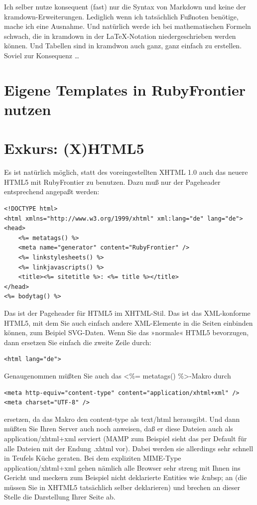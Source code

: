 \documentclass[11pt]{report}
\begin{document}
Ich selber nutze konsequent (fast) nur die Syntax von Markdown und
keine der kramdown-Erweiterungen. Lediglich wenn ich tatsächlich
Fußnoten benötige, mache ich eine Ausnahme. Und natürlich werde ich
bei mathematischen Formeln schwach, die in kramdown in der
\LaTeX{}-Notation niedergeschrieben werden können. Und Tabellen sind in
kramdwon auch ganz, ganz einfach zu erstellen. Soviel zur Konsequenz …
\chapter{Eigene Templates in RubyFrontier nutzen}
\label{sec-2-8}
\chapter{Exkurs: (X)HTML5}
\label{sec-2-9}


Es ist natürlich möglich, statt des voreingestellten XHTML 1.0 auch
das neuere HTML5 mit RubyFrontier zu benutzen. Dazu muß nur der
Pageheader entsprechend angepaßt werden:



\begin{verbatim}
<!DOCTYPE html>
<html xmlns="http://www.w3.org/1999/xhtml" xml:lang="de" lang="de">
<head>
    <%= metatags() %>
    <meta name="generator" content="RubyFrontier" />
    <%= linkstylesheets() %>
    <%= linkjavascripts() %>
    <title><%= sitetitle %>: <%= title %></title>
</head>
<%= bodytag() %>
\end{verbatim}

Das ist der Pageheader für HTML5 im XHTML-Stil. Das ist das
XML-konforme HTML5, mit dem Sie auch einfach andere XML-Elemente in
die Seiten einbinden können, zum Beipiel SVG-Daten. Wenn Sie das
»normale« HTML5 bevorzugen, dann ersetzen Sie einfach die zweite Zeile
durch:


\begin{verbatim}
<html lang="de">
\end{verbatim}

Genaugenommen müßten Sie auch das <\%= metatags() \%>-Makro durch


\begin{verbatim}
<meta http-equiv="content-type" content="application/xhtml+xml" />
<meta charset="UTF-8" />
\end{verbatim}

ersetzen, da das Makro den content-type als text/html herausgibt. Und
dann müßten Sie Ihren Server auch noch anweisen, daß er diese Dateien
auch als application/xhtml+xml serviert (MAMP zum Beispiel sieht das
per Default für alle Dateien mit der Endung .xhtml vor). Dabei werden
sie allerdings sehr schnell in Teufels Küche geraten. Bei dem
expliziten MIME-Type application/xhtml+xml gehen nämlich alle Browser
sehr streng mit Ihnen ins Gericht und meckern zum Beispiel nicht
deklarierte Entities wie \&nbsp; an (die müssen Sie in XHTML5
tatsächlich selber deklarieren) und brechen an dieser Stelle die
Darstellung Ihrer Seite ab.
\end{document}
